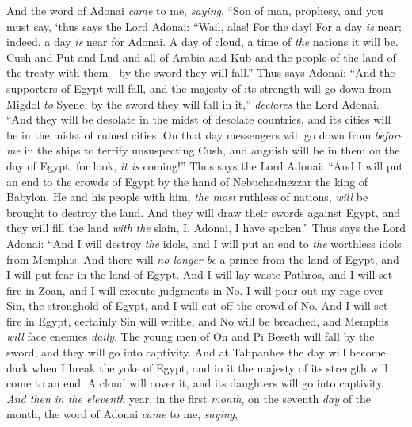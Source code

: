 \begin{biblechapter} %
 And the word of Adonai \textit{came} to me, \textit{saying},
\verse “Son of man, prophesy, and you must say, ‘thus says the Lord Adonai:
\verse “Wail, alas! For the day!
\verse For a day \textit{is} near; 
indeed, a day \textit{is} near for Adonai. 
A day of cloud, 
a time of \textit{the} nations it will be.
\verse Cush and Put and Lud and all of Arabia and Kub and the people of the land of the treaty with them—by the sword they will fall.”
\verse Thus says Adonai:
\verse “And the supporters of Egypt will fall, 
and the majesty of its strength will go down 
from Migdol \textit{to} Syene; 
by the sword they will fall in it,” 
\textit{declares} the Lord Adonai.
\verse “And they will be desolate in the midst of desolate countries, 
and its cities will be in the midst of ruined cities.
\verse On that day messengers will go down from \textit{before me} in the ships to terrify unsuspecting Cush, and anguish will be in them on the day of Egypt; for look, \textit{it is} coming!”
\verse Thus says the Lord Adonai:
\verse “And I will put an end to the crowds of Egypt 
by the hand of Nebuchadnezzar the king of Babylon.
\verse He and his people with him, \textit{the most} ruthless of nations, 
\textit{will} be brought to destroy the land. 
And they will draw their swords against Egypt, 
and they will fill the land \textit{with} \textit{the} slain, I, Adonai, I have spoken.”
\verse Thus says the Lord Adonai:
\verse “And I will destroy \textit{the} idols, 
and I will put an end to \textit{the} worthless idols from Memphis. 
And there will \textit{no longer be} a prince from the land of Egypt, 
and I will put fear in the land of Egypt.
\verse And I will lay waste Pathros, 
and I will set fire in Zoan, 
and I will execute judgments in No.
\verse I will pour out my rage over Sin, 
the stronghold of Egypt, 
and I will cut off the crowd of No.
\verse And I will set fire in Egypt, 
certainly Sin will writhe, 
and No will be breached, 
and Memphis \textit{will} face enemies \textit{daily}.
\verse The young men of On and Pi Beseth will fall by the sword, 
and they will go into captivity.
\verse And at Tahpanhes the day will become dark 
when I break the yoke of Egypt, 
and in it the majesty of its strength 
will come to an end. 
A cloud will cover it, 
and its daughters will go into captivity.
\verse \textit{And then} \textit{in the eleventh} year, in the first \textit{month}, on the seventh \textit{day} of the month, the word of Adonai \textit{came} to me, \textit{saying},

\end{biblechapter}
